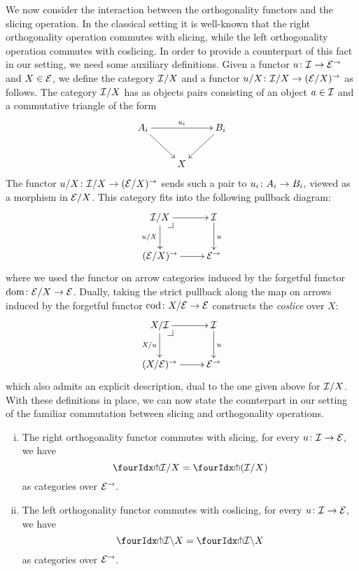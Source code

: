 \documentclass[reqno,10pt,a4paper,oneside]{amsart}
\begin{document}
We now consider the interaction between the orthogonality functors and the slicing operation. In the classical setting it is well-known that the right orthogonality operation commutes with slicing, while the left orthogonality operation commutes with coslicing.  In order to provide a counterpart of this fact in our setting, we need some auxiliary definitions. Given a functor $u \co \cal{I} \to \catE^{\to}$ and $X \in \catE$, we define the category $\cal{I}/X$
and a functor $u/X \co \cal{I}/X \to (\cal{E}/X)^\to$ as follows. The category $\cal{I}/X$ has as objects pairs consisting of an object $a \in \cal{I}$ and a commutative triangle of the form
\[
\xymatrix{
A_i \ar[dr] \ar[rr]^{u_i} & & B_i \ar[dl] \\
 & X }
 \]
The functor $u/X \co \cal{I}/X \to (\cal{E}/X)^\to$ sends such a pair to $u_i \co A_i \to B_i$, viewed as a morphism in $\cal{E}/X$. This category fits into the
following pullback diagram:
\[
\xymatrix{
  \cal{I}/X
  \ar[r]
  \ar[d]_{u/X}
  \pullback{dr}
&
  \cal{I}
  \ar[d]^{u}
\\
  (\catE/X)^{\to}
  \ar[r]
&
  \catE^{\to}
}
\]
where we used the functor on arrow categories induced by the forgetful functor $\operatorname{dom} \co \catE/X \to \catE$.  Dually, taking the strict pullback along the map on arrows induced by the forgetful functor 
$\operatorname{cod} \co X/\cal{E} \to \catE$ constructs the \emph{coslice} over $X$:
\[
\xymatrix{
  X/\cal{I}
  \ar[r]
  \ar[d]_{X/u}
  \pullback{dr}
&
  \cal{I}
  \ar[d]^{u}
\\
  (X/\catE)^{\to}
  \ar[r]
&
  \catE^{\to}
}
\]
which also admits an explicit description, dual to the one given above for $\cal{I}/X$. With these definitions in place, we can now state the counterpart in our setting of the familiar commutation between slicing and orthogonality operations. 



\begin{proposition} \hfill 
\label{pitchfork-slicing}
\begin{enumerate}[(i)]
\item The right orthogonality functor commutes with slicing, \ie for every $u \co \cal{I} \to \cal{E}$, we have
\[
  \liftr{\cal{I}}/X = \liftr{(\cal{I}/X)}
\]
as categories over $\cal{E}^\to$.
\item The left orthogonality functor commutes with coslicing, \ie for every $u \co \cal{I} \to \cal{E}$, we have
\[
 \liftl{\cal{I}} \backslash X = \liftl{\cal{I} \backslash X}
\]
as categories over $\cal{E}^\to$.
\end{enumerate}
\end{proposition}
\end{document}
